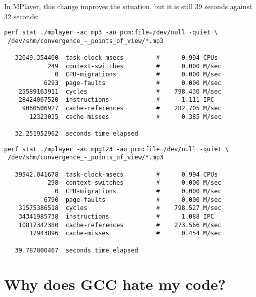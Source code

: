 \documentclass[a4paper,12pt]{scrartcl}
\begin{document}
In MPlayer, this change improves the situation, but it is still 39 seconds against 32 seconds:
\begin{verbatim}
perf stat ./mplayer -ac mp3 -ao pcm:file=/dev/null -quiet \
 /dev/shm/convergence_-_points_of_view/*.mp3

   32049.354400  task-clock-msecs         #      0.994 CPUs 
            249  context-switches         #      0.000 M/sec
              0  CPU-migrations           #      0.000 M/sec
           6293  page-faults              #      0.000 M/sec
    25589163911  cycles                   #    798.430 M/sec
    28424067520  instructions             #      1.111 IPC  
     9060506927  cache-references         #    282.705 M/sec
       12323035  cache-misses             #      0.385 M/sec

   32.251952962  seconds time elapsed
\end{verbatim}
\begin{verbatim}
perf stat ./mplayer -ac mpg123 -ao pcm:file=/dev/null -quiet \
 /dev/shm/convergence_-_points_of_view/*.mp3

   39542.041678  task-clock-msecs         #      0.994 CPUs 
            298  context-switches         #      0.000 M/sec
              0  CPU-migrations           #      0.000 M/sec
           6790  page-faults              #      0.000 M/sec
    31575386518  cycles                   #    798.527 M/sec
    34341985738  instructions             #      1.088 IPC  
    10817342380  cache-references         #    273.566 M/sec
       17943896  cache-misses             #      0.454 M/sec

   39.787800467  seconds time elapsed
\end{verbatim}

\section{Why does GCC hate my code?}
\end{document}
